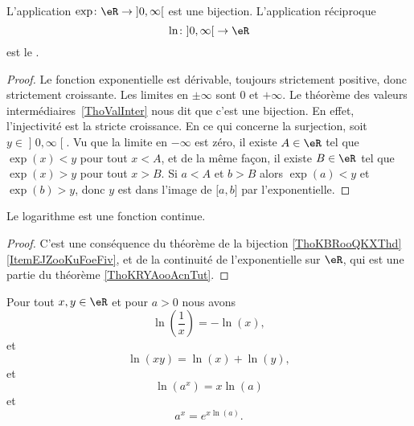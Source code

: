 \begin{propositionDef}    \label{DEFooELGOooGiZQjt}
    L'application \(\exp\colon \eR\to \mathopen] 0 , \infty \mathclose[\) est une bijection. L'application réciproque
    \begin{equation}
        \ln\colon \mathopen] 0 , \infty \mathclose[\to \eR
    \end{equation}
    est le .
\end{propositionDef}

\begin{proof}
Le fonction exponentielle est dérivable, toujours strictement positive, donc strictement croissante. Les limites en \( \pm \infty\) sont \( 0\) et \( +\infty\). Le théorème des valeurs intermédiaires~\ref{ThoValInter} nous dit que c'est une bijection. En effet, l'injectivité est la stricte croissance. En ce qui concerne la surjection, soit \( y\in \mathopen] 0 , \infty \mathclose[\). Vu que la limite en \( -\infty\) est zéro, il existe \( A\in \eR\) tel que \( \exp(x)<y\) pour tout \( x<A\), et de la même façon, il existe \( B\in \eR\) tel que \( \exp(x)>y\) pour tout \( x>B\). Si \( a<A\) et \( b>B\) alors \( \exp(a)<y\) et \( \exp(b)>y\), donc \( y\) est dans l'image de \( \mathopen[ a , b \mathclose]\) par l'exponentielle.
\end{proof}

\begin{lemma}        \label{LEMooCYGTooEjXEUu}
    Le logarithme est une fonction continue.
\end{lemma}

\begin{proof}
    C'est une conséquence du théorème de la bijection \ref{ThoKBRooQKXThd}\ref{ItemEJZooKuFoeFiv}, et de la continuité de l'exponentielle sur \( \eR\), qui est une partie du théorème \ref{ThoKRYAooAcnTut}.
\end{proof}

\begin{proposition}      \label{PROPooLAOWooEYvXmI}
    Pour tout \( x,y\in \eR\) et pour \( a>0\) nous avons
    \begin{equation}
        \ln(\frac{1}{ x })=-\ln(x),
    \end{equation}
    et
    \begin{equation}        \label{EQooJVMUooVpUKyo}
        \ln(xy)=\ln(x)+\ln(y),
    \end{equation}
    et
    \begin{equation}        \label{EQooEJQSooWCczXy}
        \ln(a^x)=x\ln(a)
    \end{equation}
    et
    \begin{equation}
        a^x= e^{x\ln(a)}.
    \end{equation}
\end{proposition}

